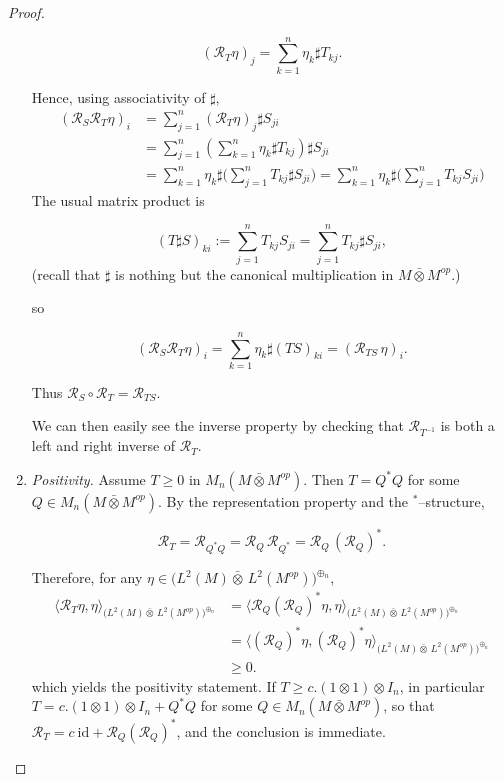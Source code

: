 \documentclass[10pt,a4paper,reqno]{amsart}
\def\qed{ \hfill \vrule width.25cm height.25cm depth0cm\smallskip}
\begin{document}
\begin{proof}
\begin{enumerate}
\[
(\mathcal R_T\eta)_j = \sum_{k=1}^n \eta_k\sharp T_{kj}.
\]


Hence, using associativity of $\sharp$,
\begin{align*}
(\mathcal R_S\mathcal R_T\eta)_i
&= \sum_{j=1}^n (\mathcal R_T\eta)_j\sharp S_{ji} \\
&= \sum_{j=1}^n \left(\sum_{k=1}^n \eta_k\sharp T_{kj}\right)\sharp S_{ji} \\
&= \sum_{k=1}^n \eta_k\sharp\Big(\sum_{j=1}^n T_{kj}\sharp S_{ji}\Big)=\sum_{k=1}^n \eta_k\sharp\Big(\sum_{j=1}^n T_{kj} S_{ji}\Big)
\end{align*}
The usual matrix product is


\[
(T\sharp S)_{ki} := \sum_{j=1}^n T_{kj} S_{ji}=\sum_{j=1}^n T_{kj}\sharp S_{ji},
\]
(recall that $\sharp$ is nothing but the canonical multiplication in $M\bar\otimes M^{op}$.)

so


\[
(\mathcal R_S\mathcal R_T\eta)_i
= \sum_{k=1}^n \eta_k\sharp (TS)_{ki}
= (\mathcal R_{TS}\,\eta)_i.
\]


Thus $\mathcal R_S\circ\mathcal R_T = \mathcal R_{TS}$.

\begin{flushleft}
    We can then easily see the inverse property by checking that $\mathcal R_{T^{-1}}$ is both a left and right inverse of $\mathcal{R}_T$.
\end{flushleft}
\item \emph{Positivity.}
Assume $T\ge0$ in $M_n(M\bar\otimes M^{op})$. Then $T=Q^\ast Q$ for some 
$Q\in M_n(M\bar\otimes M^{op})$. By the representation property and the 
$^\ast$–structure,


\[
\mathcal R_T = \mathcal R_{Q^\ast Q} = \mathcal R_Q\,\mathcal R_{Q^\ast}
= \mathcal R_Q\,(\mathcal R_Q)^\ast.
\]


Therefore, for any 
$\eta\in\big(L^2(M){\bar\otimes}\,L^2(M^{op})\big)^{\oplus_n}$,
\begin{align*}
\big\langle \mathcal R_T\eta,\eta\big\rangle_{\big(L^2(M){\bar\otimes}\,L^2(M^{op})\big)^{\oplus_n}}
&= \big\langle \mathcal R_Q(\mathcal R_Q)^\ast\eta,\eta\big\rangle_{\big(L^2(M){\bar\otimes}\,L^2(M^{op})\big)^{\oplus_n}} \\
&= \big\langle (\mathcal R_Q)^\ast\eta,(\mathcal R_Q)^\ast\eta\big\rangle_{\big(L^2(M){\bar\otimes}\,L^2(M^{op})\big)^{\oplus_n}} \\
&\ge 0.
\end{align*}
which yields the positivity statement.
\bigbreak 
If $T\geq c.(1\otimes 1)\otimes I_n$, in particular $T= c.(1\otimes 1)\otimes I_n+Q^*Q$ for some $Q\in M_n(M\bar\otimes M^{op})$, so that $\mathcal R_T=c\:\mathrm{id}+\mathcal{R}_Q(\mathcal{R}_Q)^*$, and the conclusion is immediate.
\end{enumerate}
\end{proof}
\qed
\end{document}
